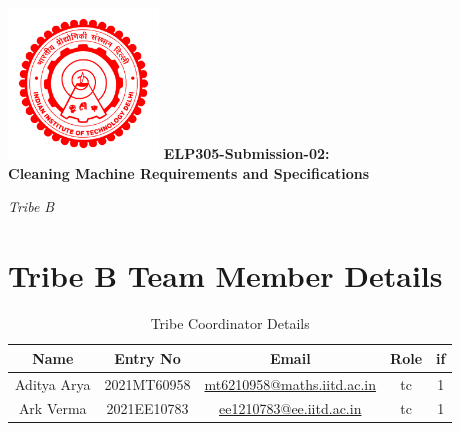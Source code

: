 \documentclass[12pt]{article} %
\begin{document}
\begin{titlepage}
\thispagestyle{empty}
\centering
\includegraphics[width=0.3\textwidth]{logo.png}
\vfill
\centering
\vspace{10pt}
{\huge\textbf{ELP305-Submission-02:\\ Cleaning Machine Requirements and Specifications}}



\vspace{1cm}
\Huge\textbf{}
\vspace{1cm}
\vfill
\huge\textit{Tribe B}
\end{titlepage}



\newpage
\section*{Tribe B Team Member Details}

\begin{table}[h!]
\centering

\begin{tabular}{|c|c|c|c|c|}
\hline
Name & Entry No & Email & Role & \acrshort{if} \\
\hline
Aditya Arya & 2021MT60958 & \href{mailto:mt6210958@maths.iitd.ac.in}{mt6210958@maths.iitd.ac.in} & \acrshort{tc} & 1 \\
Ark Verma & 2021EE10783 & \href{mailto:ee1210783@ee.iitd.ac.in}{ee1210783@ee.iitd.ac.in} & \acrshort{tc} & 1 \\
\hline
\end{tabular}
\caption{Tribe Coordinator Details}
\label{tab:teamDetails}
\end{table}
\end{document}
